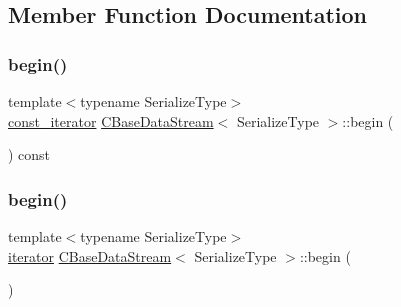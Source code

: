 \subsection{Member Function Documentation}
\mbox{\label{class_c_base_data_stream_abed61420f8a28a0c7ea0baeaa87b925b}} 
\subsubsection{\texorpdfstring{begin()}{begin()}\hspace{0.1cm}{\footnotesize\ttfamily [1/2]}}
{\footnotesize\ttfamily template$<$typename Serialize\+Type$>$ \\
\mbox{\hyperlink{class_c_base_data_stream_a9cf3080c5a75c94568980a59d3aab3ad}{const\+\_\+iterator}} \mbox{\hyperlink{class_c_base_data_stream}{C\+Base\+Data\+Stream}}$<$ Serialize\+Type $>$\+::begin (\begin{DoxyParamCaption}{ }\end{DoxyParamCaption}) const\hspace{0.3cm}{\ttfamily [inline]}}

\mbox{\label{class_c_base_data_stream_a6b26f6547fc8d86bee0d9158805bb1ac}} 
\subsubsection{\texorpdfstring{begin()}{begin()}\hspace{0.1cm}{\footnotesize\ttfamily [2/2]}}
{\footnotesize\ttfamily template$<$typename Serialize\+Type$>$ \\
\mbox{\hyperlink{class_c_base_data_stream_a23e0e0af1c68dd36c27162036b6d048d}{iterator}} \mbox{\hyperlink{class_c_base_data_stream}{C\+Base\+Data\+Stream}}$<$ Serialize\+Type $>$\+::begin (\begin{DoxyParamCaption}{ }\end{DoxyParamCaption})\hspace{0.3cm}{\ttfamily [inline]}}

\mbox{\label{class_c_base_data_stream_af453f4e42cd6ba6b76d925c4c137786e}} 
